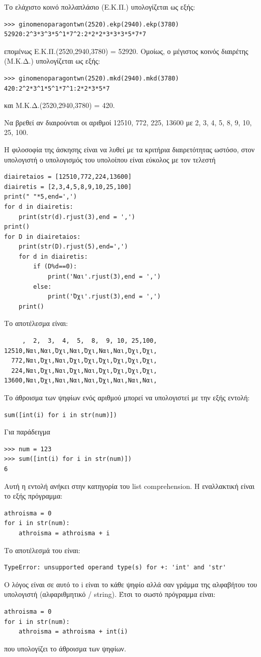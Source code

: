 Το ελάχιστο κοινό πολλαπλάσιο (Ε.Κ.Π.) υπολογίζεται ως εξής:

\begin{lstlisting}
>>> ginomenoparagontwn(2520).ekp(2940).ekp(3780)
52920:2^3*3^3*5^1*7^2:2*2*2*3*3*3*5*7*7
\end{lstlisting}
επομένως Ε.Κ.Π.(2520,2940,3780) = 52920.
Ομοίως, ο μέγιστος κοινός διαιρέτης (Μ.Κ.Δ.) υπολογίζεται ως εξής:

\begin{lstlisting}
>>> ginomenoparagontwn(2520).mkd(2940).mkd(3780)
420:2^2*3^1*5^1*7^1:2*2*3*5*7
\end{lstlisting}
και Μ.Κ.Δ.(2520,2940,3780) = 420.

\begin{exercise}
 Να βρεθεί αν διαιρούνται οι αριθμοί 12510, 772, 225, 13600 με 2, 3, 4, 5, 8, 9, 10, 25, 100.\end{exercise}

Η φιλοσοφία της άσκησης είναι να λυθεί με τα κριτήρια διαιρετότητας ωστόσο, στον υπολογιστή ο υπολογισμός του υπολοίπου είναι εύκολος με τον τελεστή %
\begin{lstlisting}
diairetaios = [12510,772,224,13600]
diairetis = [2,3,4,5,8,9,10,25,100]
print(" "*5,end=',')
for d in diairetis:
    print(str(d).rjust(3),end = ',')
print()
for D in diairetaios:
    print(str(D).rjust(5),end=',')
    for d in diairetis:
        if (D%d==0):
            print('Ναι'.rjust(3),end = ',')
        else:
            print('Όχι'.rjust(3),end = ',')
    print()
\end{lstlisting}
Το αποτέλεσμα είναι:
\begin{lstlisting}
     ,  2,  3,  4,  5,  8,  9, 10, 25,100,
12510,Ναι,Ναι,Όχι,Ναι,Όχι,Ναι,Ναι,Όχι,Όχι,
  772,Ναι,Όχι,Ναι,Όχι,Όχι,Όχι,Όχι,Όχι,Όχι,
  224,Ναι,Όχι,Ναι,Όχι,Ναι,Όχι,Όχι,Όχι,Όχι,
13600,Ναι,Όχι,Ναι,Ναι,Ναι,Όχι,Ναι,Ναι,Ναι,
\end{lstlisting}

Το άθροισμα των ψηφίων ενός αριθμού μπορεί να υπολογιστεί με την εξής εντολή:
\begin{lstlisting}
sum([int(i) for i in str(num)])
\end{lstlisting}
Για παράδειγμα
\begin{lstlisting}
>>> num = 123
>>> sum([int(i) for i in str(num)])
6
\end{lstlisting}
Αυτή η εντολή ανήκει στην κατηγορία του list comprehension. Η εναλλακτική είναι το εξής πρόγραμμα:
\begin{lstlisting}
athroisma = 0
for i in str(num):
    athroisma = athroisma + i
\end{lstlisting}
Το αποτέλεσμά του είναι:
\begin{lstlisting} 
TypeError: unsupported operand type(s) for +: 'int' and 'str'
\end{lstlisting}
Ο λόγος είναι σε αυτό το i είναι το κάθε ψηφίο αλλά σαν γράμμα της αλφαβήτου του υπολογιστή (αλφαριθμητικό / string). Έτσι το σωστό πρόγραμμα είναι:
\begin{lstlisting}
athroisma = 0
for i in str(num):
    athroisma = athroisma + int(i)
\end{lstlisting}
που υπολογίζει το άθροισμα των ψηφίων.

